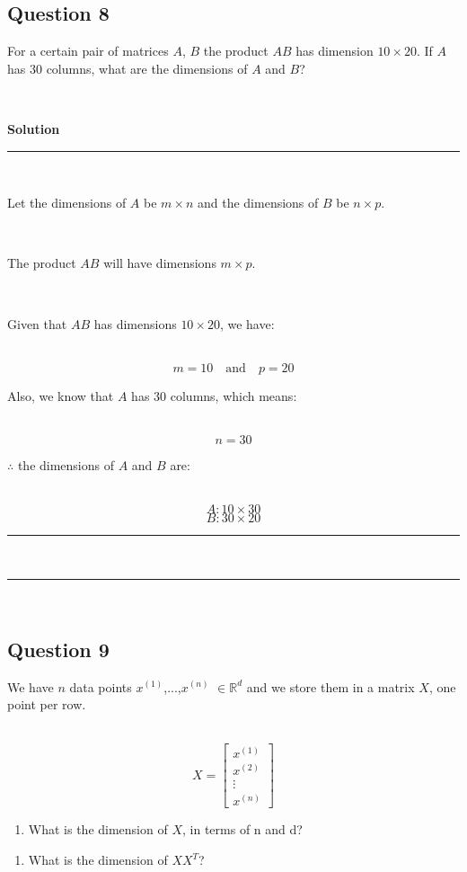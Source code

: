 \documentclass{article}
\begin{document}
\newpage
\subsection*{Question 8}
\parbox{\textwidth}{For a certain pair of matrices $A$, $B$ the product $AB$ has dimension $10 \times 20$. If $A$ has $30$ columns, what are the dimensions of $A$ and $B$?}\\

\parbox{\textwidth}{\textbf{Solution}}
\noindent\rule{\textwidth}{0.4pt}\\
\parbox{\textwidth}{Let the dimensions of $A$ be $m \times n$ and the dimensions of $B$ be $n \times p$.}\\
\parbox{\textwidth}{The product $AB$ will have dimensions $m \times p$.}\\
\parbox{\textwidth}{Given that $AB$ has dimensions $10 \times 20$, we have:}\\
$$m = 10 \quad \text{and} \quad p = 20$$
\parbox{\textwidth}{Also, we know that $A$ has $30$ columns, which means:}\\
$$n = 30$$
\parbox{\textwidth}{$\therefore$ the dimensions of $A$ and $B$ are:}\\
$$A: 10 \times 30$$
$$B: 30 \times 20$$

\noindent\rule{\textwidth}{0.4pt}\\
\noindent\rule{\textwidth}{0.4pt}\\

\newpage

\subsection*{Question 9}
\parbox{\textwidth}{We have $n$ data points $x^{(1)}$,...,$x^{(n)}$ $\in \mathbb{R}^d$ and we store them in a matrix $X$, one point per row.}\\
$$X = \begin{bmatrix}
x^{(1)} \\
x^{(2)} \\
\vdots \\
x^{(n)}
\end{bmatrix}$$

\begin{enumerate}[label=(a)]
    \item What is the dimension of $X$, in terms of n and d?
\end{enumerate}

\begin{enumerate}[label=(b)]
    \item What is the dimension of ${XX}^T$?
\end{enumerate}
\end{document}
